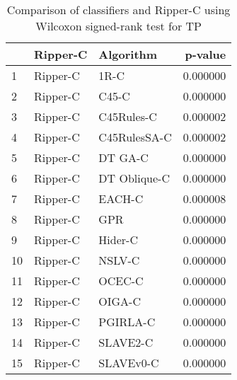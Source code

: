\begin{table}
\footnotesize
\caption{Comparison of classifiers and Ripper-C using Wilcoxon signed-rank test for TP}
\label{tab:Ripper-C wilcoxon TP comparison}
\begin{tabular}{lllr}
\hline
 & Ripper-C & Algorithm & p-value \\
\hline
1 & Ripper-C & 1R-C & 0.000000 \\
2 & Ripper-C & C45-C & 0.000000 \\
3 & Ripper-C & C45Rules-C & 0.000002 \\
4 & Ripper-C & C45RulesSA-C & 0.000002 \\
5 & Ripper-C & DT GA-C & 0.000000 \\
6 & Ripper-C & DT Oblique-C & 0.000000 \\
7 & Ripper-C & EACH-C & 0.000008 \\
8 & Ripper-C & GPR & 0.000000 \\
9 & Ripper-C & Hider-C & 0.000000 \\
10 & Ripper-C & NSLV-C & 0.000000 \\
11 & Ripper-C & OCEC-C & 0.000000 \\
12 & Ripper-C & OIGA-C & 0.000000 \\
13 & Ripper-C & PGIRLA-C & 0.000000 \\
14 & Ripper-C & SLAVE2-C & 0.000000 \\
15 & Ripper-C & SLAVEv0-C & 0.000000 \\
\hline
\end{tabular}
\end{table}
